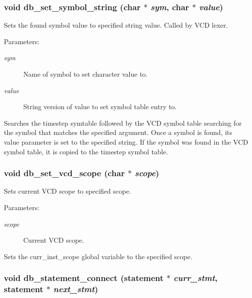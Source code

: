 \subsubsection{\setlength{\rightskip}{0pt plus 5cm}void db\_\-set\_\-symbol\_\-string (char $\ast$ {\em sym}, char $\ast$ {\em value})}\label{db_8c_a34}


Sets the found symbol value to specified string value. Called by VCD lexer.

\begin{Desc}
\item[Parameters: ]\par
\begin{description}
\item[{\em 
sym}]Name of symbol to set character value to. \item[{\em 
value}]String version of value to set symbol table entry to.\end{description}
\end{Desc}
Searches the timestep symtable followed by the VCD symbol table searching for the symbol that matches the specified argument. Once a symbol is found, its value parameter is set to the specified string. If the symbol was found in the VCD symbol table, it is copied to the timestep symbol table. 
\subsubsection{\setlength{\rightskip}{0pt plus 5cm}void db\_\-set\_\-vcd\_\-scope (char $\ast$ {\em scope})}\label{db_8c_a30}


Sets current VCD scope to specified scope.

\begin{Desc}
\item[Parameters: ]\par
\begin{description}
\item[{\em 
scope}]Current VCD scope.\end{description}
\end{Desc}
Sets the curr\_\-inst\_\-scope global variable to the specified scope. 
\subsubsection{\setlength{\rightskip}{0pt plus 5cm}void db\_\-statement\_\-connect ({\bf statement} $\ast$ {\em curr\_\-stmt}, {\bf statement} $\ast$ {\em next\_\-stmt})}\label{db_8c_a28}


